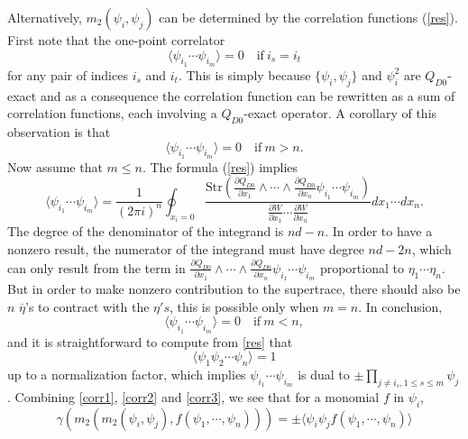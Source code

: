 \documentclass[a4paper,11pt]{article}
\numberwithin{equation}{section}
\begin{document}
Alternatively, $m_2(\psi_i,\psi_j)$ can be determined by the correlation 
functions (\ref{res}).
First note that the one-point correlator
\begin{equation}\label{corr1}
\langle \psi_{i_1}\cdots \psi_{i_m} \rangle = 0 \quad
\mathrm{if}~ i_s = i_t 
\end{equation}
for any pair of indices $i_s$ and $i_t$. This is simply because $\{ 
\psi_i,\psi_j \}$ and $\psi_i^2$ are $Q_{D0}$-exact and as a consequence the 
correlation function can be rewritten as a sum of correlation functions, each 
involving a $Q_{D0}$-exact operator. A corollary of this 
observation is that
\begin{equation}\label{corr2}
\langle \psi_{i_1}\cdots \psi_{i_m} \rangle = 0 \quad \mathrm{if} ~m>n.
\end{equation}
Now assume that $m \leq n$. The formula (\ref{res}) implies
\begin{equation}
\langle \psi_{i_1}\cdots \psi_{i_m} \rangle = \frac{1}{(2 \pi i)^n} 
\oint_{x_i=0} \frac{\mathrm{Str}\left( \frac{\partial Q_{D0}}{\partial x_1} 
\wedge \cdots \wedge \frac{\partial Q_{D0}}{\partial x_n} \psi_{i_1}\cdots 
\psi_{i_m} \right)}{\frac{\partial W}{\partial x_1} \cdots \frac{\partial 
W}{\partial x_n}} dx_1\cdots dx_n.
\end{equation}
The degree of the denominator of the integrand is $nd-n$. In order to have a 
nonzero result, the numerator of the integrand must have degree $nd-2n$, which 
can only result from the term in $\frac{\partial Q_{D0}}{\partial x_1} \wedge 
\cdots \wedge \frac{\partial Q_{D0}}{\partial x_n} \psi_{i_1}\cdots \psi_{i_m}$ 
proportional to $\eta_1\cdots\eta_n$. But in order to make nonzero contribution 
to the supertrace, there should also be $n$ $\overline{\eta}$'s to contract with 
the $\eta's$, this is possible only when $m=n$. In conclusion,
\begin{equation}\label{corr3}
\langle \psi_{i_1}\cdots \psi_{i_m} \rangle = 0 \quad \mathrm{if} ~m<n,
\end{equation}
and it is straightforward to compute from \eqref{res} that
\begin{equation}\label{corr0}
\langle \psi_1 \psi_2 \cdots \psi_n \rangle = 1
\end{equation}
up to a normalization factor, which implies $\psi_{i_1}\cdots \psi_{i_m}$ is 
dual to $\pm \prod_{j \neq i_s, 1\leq s \leq m}\psi_j$. Combining 
\eqref{corr1}, \eqref{corr2} and \eqref{corr3}, we see that for a monomial $f$ 
in $\psi_i$,
\begin{equation}
\gamma(m_2(m_2(\psi_i,\psi_j),f(\psi_1,\cdots,\psi_n))) = \pm \langle \psi_i 
\psi_j f(\psi_1,\cdots,\psi_n) \rangle 
\end{equation}
\end{document}
